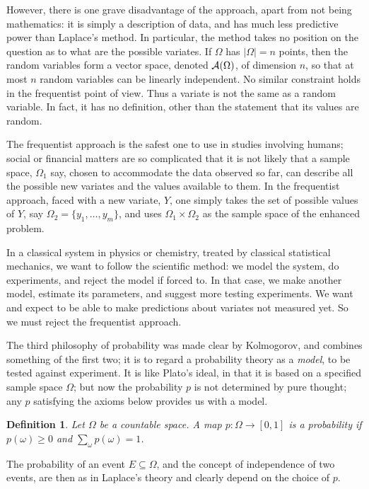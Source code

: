 \documentclass[12pt]{article}
\newtheorem{definition}[theorem]{Definition}
\begin{document}
However, there is one
grave disadvantage of the approach, apart from not being mathematics: it
is simply a description of data, and has much less predictive power than
Laplace's method. In particular, the method takes no position on the
question as to what are the possible variates. If
$\Omega$ has $|\Omega|=n$ points, then the random variables form a vector
space, denoted ${\cal A}(\Omega)$, of dimension $n$, so that at most $n$
random variables can
be linearly independent. No similar constraint holds in the frequentist
point of view. Thus a variate is not the same as a random variable.
In fact, it has no definition, other than the statement that its values are
random.

The frequentist approach is the safest one to use in studies
involving humans; social or financial matters are so complicated that
it is not likely that a sample space, $\Omega_1$ say, chosen to accommodate
the data observed so far, can describe all the possible new variates and the
values available to them. In the frequentist approach, faced with a new
variate, $Y$, one simply
takes the set of possible values of $Y$, say $\Omega_2=\{y_1,\ldots,y_m\}$,
and uses $\Omega_1\times\Omega_2$
as the sample space of the enhanced problem.

In a classical system in physics or chemistry, treated by classical
statistical mechanics, we want to follow the
scientific method: we model the system, do experiments, and
reject the model if forced to. In that case, we make another model,
estimate its parameters, and suggest more testing experiments.
We want and expect to be able to make predictions about variates not
measured yet. So we must reject the frequentist approach.

The third philosophy of probability \cite{Kolmogorov}was made clear by Kolmogorov, and
combines something of the first two;
it is to regard a probability theory as a {\em model}, to be tested
against experiment. It is like Plato's ideal, in that it
is based on a specified sample space $\Omega$;
but now the probability $p$ is not determined by
pure thought; any $p$ satisfying the axioms below provides us with a model.
\begin{definition}
Let $\Omega$ be a countable space.
A map $p:\Omega\rightarrow[0,1]$ is a {\em probability} if
$p(\omega)\geq0$ and $\sum_\omega p(\omega)=1$.
\label{probability}
\end{definition}
The probability of an event $E\subseteq\Omega$, and the concept of
independence of two events, are then as in Laplace's theory and clearly
depend on the choice of $p$.
\end{document}
